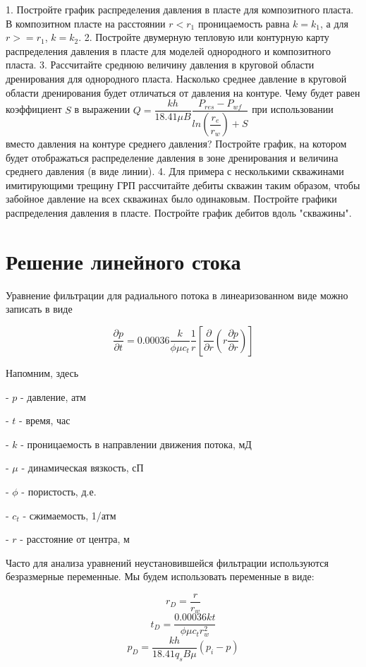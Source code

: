 \documentclass[oneside, openany]{memoir}
\begin{document}
	1. Постройте график распределения давления в пласте для композитного пласта. В композитном пласте на расстоянии $r<r_1$ проницаемость равна $k=k_1$, а для $r>=r_1$, $k=k_2$. 
	2. Постройте двумерную тепловую или контурную карту распределения давления в пласте для моделей однородного и композитного пласта.
	3. Рассчитайте среднюю величину давления в круговой области дренирования для однородного пласта. Насколько среднее давление в круговой области дренирования будет отличаться от давления на контуре. Чему будет равен коэффициент $S$ в выражении  $Q=\dfrac{kh}{18.41\mu B} \dfrac{P_{res}-P_{wf}}{ln(\dfrac{r_e}{r_w})+S}$ при использовании вместо давления на контуре среднего давления? Постройте график, на котором будет отображаться распределение давления в зоне дренирования и величина среднего давления (в виде линии).
	4. Для примера с несколькими скважинами имитирующими трещину ГРП рассчитайте дебиты скважин таким образом, чтобы забойное давление на всех скважинах было одинаковым. Постройте графики распределения давления в пласте. Постройте график дебитов вдоль "скважины".
	
	\section{Решение линейного стока}
	
	Уравнение фильтрации для радиального потока в линеаризованном виде можно записать в виде
	
	\begin{equation}
		\frac{\partial p}{\partial t} = 0.00036 \dfrac{k}{\phi \mu c_t} \dfrac{1}{r} \left[ \dfrac{\partial}{\partial r} \left( r \dfrac{ \partial p} {\partial r} \right) \right]		
	\end{equation} 

	
	Напомним, здесь
	
	- $p$ - давление, атм
	
	- $t$ - время, час
	
	- $k$ - проницаемость в направлении движения потока, мД
	
	- $\mu$ - динамическая вязкость, сП
	
	- $\phi$ - пористость, д.е.
	
	- $c_t$ - сжимаемость, 1/атм
	
	- $r$ - расстояние от центра, м
	
	Часто для анализа уравнений неустановившейся фильтрации используются безразмерные переменные. Мы будем использовать переменные в виде:
	
	$$ r_D = \frac{r}{r_w}  $$
	$$ t_D = \frac{0.00036 kt}{\phi \mu c_t r_w^2}  $$
	$$ p_D = \frac{kh}{ 18.41 q_s B \mu} \left( p_i - p \right)   $$
	
\end{document}
